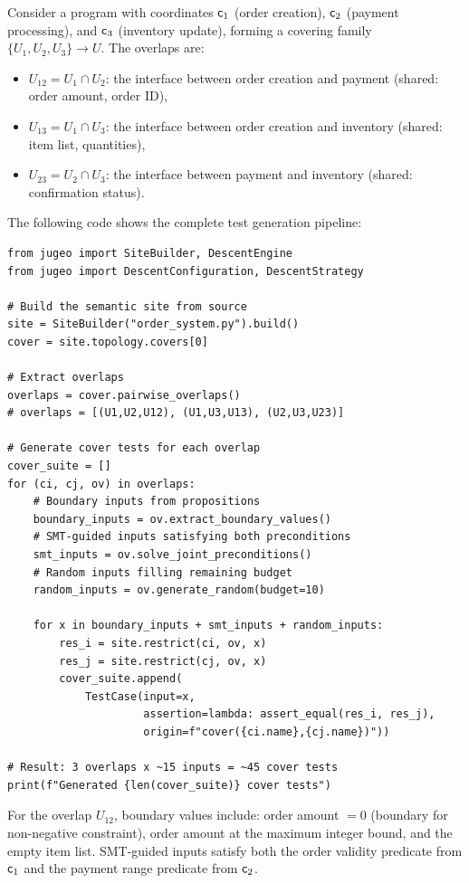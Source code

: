 \documentclass[11pt]{article}
\begin{document}
\begin{example}\label{ex:order-cover}
Consider a program with coordinates $\mathsf{c}_1$ (order creation),
$\mathsf{c}_2$ (payment processing), and $\mathsf{c}_3$ (inventory update),
forming a covering family $\{U_1, U_2, U_3\} \to U$.  The overlaps are:
\begin{itemize}[noitemsep]
  \item $U_{12} = U_1 \cap U_2$: the interface between order creation and
        payment (shared: order amount, order ID),
  \item $U_{13} = U_1 \cap U_3$: the interface between order creation and
        inventory (shared: item list, quantities),
  \item $U_{23} = U_2 \cap U_3$: the interface between payment and
        inventory (shared: confirmation status).
\end{itemize}

The following code shows the complete test generation pipeline:
\begin{lstlisting}[style=jugeo-python]
from jugeo import SiteBuilder, DescentEngine
from jugeo import DescentConfiguration, DescentStrategy

# Build the semantic site from source
site = SiteBuilder("order_system.py").build()
cover = site.topology.covers[0]

# Extract overlaps
overlaps = cover.pairwise_overlaps()
# overlaps = [(U1,U2,U12), (U1,U3,U13), (U2,U3,U23)]

# Generate cover tests for each overlap
cover_suite = []
for (ci, cj, ov) in overlaps:
    # Boundary inputs from propositions
    boundary_inputs = ov.extract_boundary_values()
    # SMT-guided inputs satisfying both preconditions
    smt_inputs = ov.solve_joint_preconditions()
    # Random inputs filling remaining budget
    random_inputs = ov.generate_random(budget=10)

    for x in boundary_inputs + smt_inputs + random_inputs:
        res_i = site.restrict(ci, ov, x)
        res_j = site.restrict(cj, ov, x)
        cover_suite.append(
            TestCase(input=x,
                     assertion=lambda: assert_equal(res_i, res_j),
                     origin=f"cover({ci.name},{cj.name})"))

# Result: 3 overlaps x ~15 inputs = ~45 cover tests
print(f"Generated {len(cover_suite)} cover tests")
\end{lstlisting}

For the overlap $U_{12}$, boundary values include: order amount $= 0$
(boundary for non-negative constraint), order amount at the maximum
integer bound, and the empty item list.  SMT-guided inputs satisfy both
the order validity predicate from $\mathsf{c}_1$ and the payment range
predicate from $\mathsf{c}_2$.
\end{example}
\end{document}
